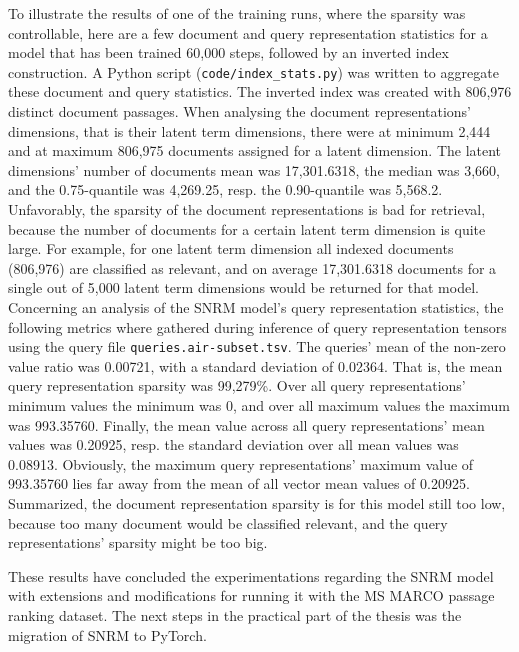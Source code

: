 To illustrate the results of one of the training runs, where the sparsity was controllable, 
    here are a few document and query representation statistics for a model that has been 
    trained 60,000 steps, followed by an inverted index construction.
A Python script (\texttt{code/index\_stats.py}) was written to aggregate these document and
    query statistics.
The inverted index was created with 806,976 distinct document passages.
When analysing the document representations' dimensions, that is their latent term dimensions,
    there were at minimum 2,444 and at maximum 806,975 documents assigned for a latent dimension.
The latent dimensions' number of documents mean was 17,301.6318, the median was 3,660, and the
    0.75-quantile was 4,269.25, resp. the 0.90-quantile was 5,568.2.
Unfavorably, the sparsity of the document representations is bad for retrieval, because
    the number of documents for a certain latent term dimension is quite large.
For example, for one latent term dimension all indexed documents (806,976) are classified as relevant,
    and on average 17,301.6318 documents for a single out of 5,000 latent term dimensions
    would be returned for that model.\\
Concerning an analysis of the SNRM model's query representation statistics,
    the following metrics where gathered during inference of query representation tensors
    using the query file \texttt{queries.air-subset.tsv}.
The queries' mean of the non-zero value ratio was 0.00721, with a standard deviation of
    0.02364.
That is, the mean query representation sparsity was 99,279\%.
Over all query representations' minimum values the minimum was 0, and over all
    maximum values the maximum was 993.35760.
Finally, the mean value across all query representations' mean values was 0.20925, 
    resp. the standard deviation over all mean values was 0.08913.
Obviously, the maximum query representations' maximum value of 993.35760 lies far away from the mean of
    all vector mean values of 0.20925.
Summarized, the document representation sparsity is for this model still too low, because 
    too many document would be classified relevant, and the query representations' sparsity might be too big.

These results have concluded the experimentations regarding the SNRM model with extensions and modifications
    for running it with the MS MARCO passage ranking dataset.
The next steps in the practical part of the thesis was the migration of SNRM to PyTorch.

